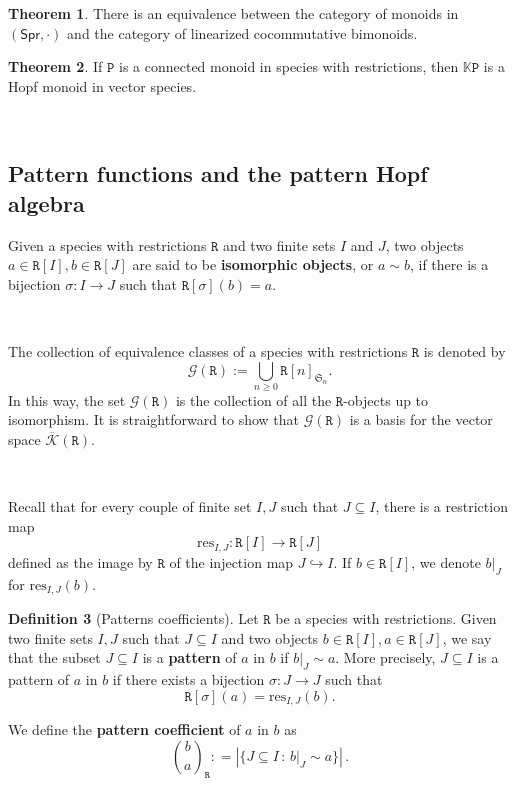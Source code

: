 \documentclass[12pt, reqno]{amsart}
\theoremstyle{definition}
\newtheorem{thm}{Theorem}[section]
\newtheorem{defin}[thm]{Definition}
\newcommand{\Spr}{\mathsf{Spr}} %
\newcommand{\prP}{\mathtt{P}}
\newcommand{\prR}{\mathtt{R}}
\newcommand{\Kc}{\mathcal{K}}
\newcommand{\Kcb}{\overline{\Kc}}
\begin{document}
\begin{thm}
There is an equivalence between the category of monoids in $(\Spr, \cdot)$ and the category of linearized cocommutative bimonoids.
\end{thm}


\begin{thm}
If $\prP$ is a connected monoid in species with restrictions, then $\mathbb{K}\prP$ is a Hopf monoid in vector species.
\end{thm}

\

\subsection{Pattern functions and the pattern Hopf algebra}


Given a species with restrictions $\prR$ and two finite sets $I$ and $J$, two objects $a\in \prR[I], b\in \prR[J]$ are said to be {\bf isomorphic objects}, or $a\sim b$, if there is a bijection $\sigma:I\to J$ such that $\prR[\sigma](b)=a$. 

\

The collection of equivalence classes of a species with restrictions $\prR$ is denoted by \begin{equation}
\mathcal{G}(\prR) := \bigcup_{n\geq 0 } \prR[n]_{\mathfrak{S}_n}.
\end{equation}
In this way, the set $\mathcal G(\prR) $ is the collection of all the $\prR$-objects up to isomorphism. It is straightforward to show that $\mathcal{G}(\prR)$ is a basis for the vector space $\Kcb(\prR)$.

\

Recall that for every couple of finite set $I,J$ such that $J \subseteq I$, there is a restriction map 
\[\text{res}_{I,J}: \prR[I] \to \prR[J]\]
defined as the image by $\prR$ of the injection map $J \hookrightarrow I$. If $b \in \prR[I]$, we denote $b|_J$ for $\text{res}_{I,J}(b)$.

\begin{defin}[Patterns coefficients]\label{defin:patterncoeff}
Let $\prR$ be a species with restrictions. Given two finite sets $I,J$ such that $J \subseteq I$ and two objects $b\in \prR[I], a\in \prR[J]$,
we say that the subset $J \subseteq I$ is a {\bf pattern} of $a$ in $b$ if $b|_{J} \sim a$. More precisely, $J \subseteq I$ is a pattern of $a$ in $b$ if there exists a bijection $\sigma: J \to J$ such that
\[\prR[\sigma](a)=\text{res}_{I,J}(b).\]

We define the {\bf pattern coefficient} of $a$ in $b$ as
\begin{equation}
    \binom{b}{a}_{\!\prR} : = \left| \{J \subseteq I \, : \, b|_J \sim a \} \right| \, .
\end{equation}
\end{defin}
\end{document}
